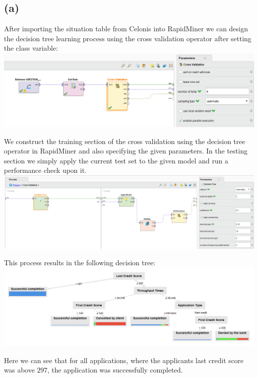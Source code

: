 \documentclass[../main.tex]{subfiles}
\begin{document}
\subsection*{(a)}
After importing the situation table from Celonis into RapidMiner we can design the decision tree learning process using the cross validation operator after setting the class variable: \\
\includegraphics[width=\textwidth]{img/RapidMiner_Process_Overview.png}

We construct the training section of the cross validation using the decision tree operator in RapidMiner and also specifying the given parameters. In the testing section we simply apply the current test set to the given model and run a performance check upon it. \\
\includegraphics[width=\textwidth]{img/RapidMiner_Process_Cross_Validation.png}

This process results in the following decision tree: \\
\includegraphics[width=\textwidth]{img/RapidMiner_Results_Decision_Tree.png}

Here we can see that for all applications, where the applicants last credit score was above $297$, the application was successfully completed.
\end{document}
